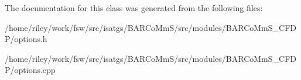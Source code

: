 The documentation for this class was generated from the following files\+:\begin{DoxyCompactItemize}
\item 
/home/riley/work/fsw/src/isatgs/\+B\+A\+R\+Co\+Mm\+S/src/modules/\+B\+A\+R\+Co\+Mm\+S\+\_\+\+C\+F\+D\+P/options.\+h\item 
/home/riley/work/fsw/src/isatgs/\+B\+A\+R\+Co\+Mm\+S/src/modules/\+B\+A\+R\+Co\+Mm\+S\+\_\+\+C\+F\+D\+P/options.\+cpp\end{DoxyCompactItemize}
